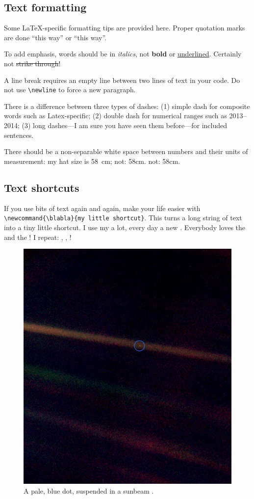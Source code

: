 \subsection{Text formatting}
Some \LaTeX-specific formatting tips are provided here. Proper quotation marks are done ``this way'' or \enquote{this way}. 

To add emphasis, words should be in \textit{italics}, not \textbf{bold} or \underline{underlined}. Certainly not \st{strike through}!

A line break requires an empty line between two lines of text in your code. Do not use \verb+\newline+ to force a new paragraph.

There is a difference between three types of dashes: (1) simple dash for composite words such as Latex-specific; (2) double dash for numerical ranges such as 2013--2014; (3) long dashes---I am sure you have seen them before---for included sentences.

There should be a non-separable white space between numbers and their units of measurement: my hat size is 58~cm; not: 58cm. not: 58\newline cm.




\subsection{Text shortcuts}
If you use bits of text again and again, make your life easier with
\newline
 \verb+ \newcommand{\blabla}{my little shortcut}+. This turns a long string of text into a tiny little shortcut. I use my \fc a lot, every day a new \fc. Everybody loves the \fc and the \roc! I repeat: \roc, \roc, \roc!

\begin{figure}[t]
	\centering
	\includegraphics[width=0.25\linewidth]{Figures/PaleBlueDot.jpg}
	\caption{A pale, blue dot, suspended in a sunbeam \citep{NASA}.}
	\label{samplefig}
\end{figure}

